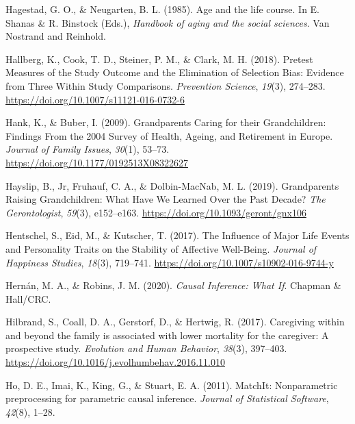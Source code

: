 \documentclass[
  english,
  man, noextraspace]{apa7}
\begin{document}
\leavevmode\hypertarget{ref-hagestadAgeLifeCourse1985}{}%
Hagestad, G. O., \& Neugarten, B. L. (1985). Age and the life course. In E. Shanas \& R. Binstock (Eds.), \emph{Handbook of aging and the social sciences}. Van Nostrand and Reinhold.

\leavevmode\hypertarget{ref-hallbergPretestMeasuresStudy2018}{}%
Hallberg, K., Cook, T. D., Steiner, P. M., \& Clark, M. H. (2018). Pretest Measures of the Study Outcome and the Elimination of Selection Bias: Evidence from Three Within Study Comparisons. \emph{Prevention Science}, \emph{19}(3), 274--283. \url{https://doi.org/10.1007/s11121-016-0732-6}

\leavevmode\hypertarget{ref-hankGrandparentsCaringTheir2009}{}%
Hank, K., \& Buber, I. (2009). Grandparents Caring for their Grandchildren: Findings From the 2004 Survey of Health, Ageing, and Retirement in Europe. \emph{Journal of Family Issues}, \emph{30}(1), 53--73. \url{https://doi.org/10.1177/0192513X08322627}

\leavevmode\hypertarget{ref-hayslipGrandparentsRaisingGrandchildren2019}{}%
Hayslip, B., Jr, Fruhauf, C. A., \& Dolbin-MacNab, M. L. (2019). Grandparents Raising Grandchildren: What Have We Learned Over the Past Decade? \emph{The Gerontologist}, \emph{59}(3), e152--e163. \url{https://doi.org/10.1093/geront/gnx106}

\leavevmode\hypertarget{ref-hentschelInfluenceMajorLife2017}{}%
Hentschel, S., Eid, M., \& Kutscher, T. (2017). The Influence of Major Life Events and Personality Traits on the Stability of Affective Well-Being. \emph{Journal of Happiness Studies}, \emph{18}(3), 719--741. \url{https://doi.org/10.1007/s10902-016-9744-y}

\leavevmode\hypertarget{ref-hernanCausalInferenceWhat2020}{}%
Hernán, M. A., \& Robins, J. M. (2020). \emph{Causal Inference: What If}. Chapman \& Hall/CRC.

\leavevmode\hypertarget{ref-hilbrandCaregivingFamilyAssociated2017}{}%
Hilbrand, S., Coall, D. A., Gerstorf, D., \& Hertwig, R. (2017). Caregiving within and beyond the family is associated with lower mortality for the caregiver: A prospective study. \emph{Evolution and Human Behavior}, \emph{38}(3), 397--403. \url{https://doi.org/10.1016/j.evolhumbehav.2016.11.010}

\leavevmode\hypertarget{ref-MatchIt2011}{}%
Ho, D. E., Imai, K., King, G., \& Stuart, E. A. (2011). MatchIt: Nonparametric preprocessing for parametric causal inference. \emph{Journal of Statistical Software}, \emph{42}(8), 1--28.
\end{document}
